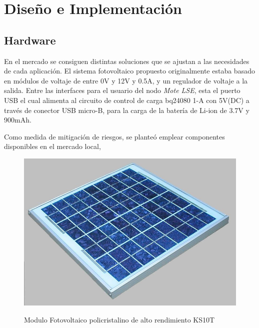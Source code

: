 
\chapter{Diseño e Implementación} %

\label{Chapter3} %

\section{Hardware}
\label{sec:hard}
En el mercado se consiguen distintas soluciones que se ajustan a las necesidades de cada aplicación. El sistema fotovoltaico propuesto originalmente estaba basado en módulos de voltaje de entre 0V y 12V y 0.5A, y un regulador de voltaje a la salida. Entre las interfaces para el usuario del nodo \textit{Mote LSE}, esta el puerto USB  el cual alimenta al circuito de control de carga bq24080 1-A con 5V(DC) a través de conector USB micro-B, para la carga de la batería de Li-ion de 3.7V y 900mAh.

Como medida de mitigación de riesgos, se planteó emplear componentes disponibles en el mercado local, 

 \begin{figure}[h!]
	\centering
    \includegraphics[width=1\textwidth]{./Figures/ks10t.jpg}
	\label{fig:GANTT2}
	\caption{Modulo Fotovoltaico policristalino de alto rendimiento KS10T}
\end{figure}


